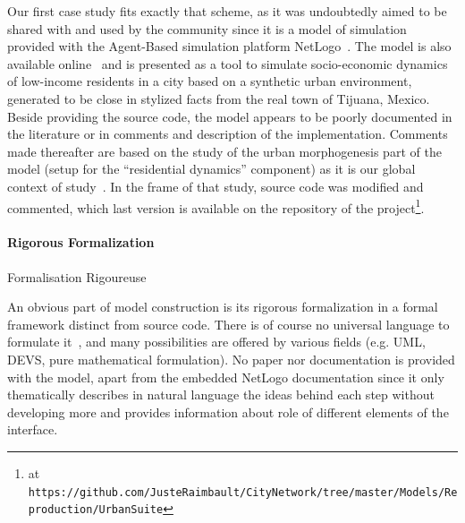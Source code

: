 Our first case study fits exactly that scheme, as it was undoubtedly aimed to be shared with and used by the community since it is a model of simulation provided with the Agent-Based simulation platform NetLogo~\cite{wilensky1999netlogo}. The model is also available online~\cite{de2007netlogo} and is presented as a tool to simulate socio-economic dynamics of low-income residents in a city based on a synthetic urban environment, generated to be close in stylized facts from the real town of Tijuana, Mexico. Beside providing the source code, the model appears to be poorly documented in the literature or in comments and description of the implementation. Comments made thereafter are based on the study of the urban morphogenesis part of the model (setup for the ``residential dynamics'' component) as it is our global context of study~\cite{raimbault2014vers}. In the frame of that study, source code was modified and commented, which last version is available on the repository of the project\footnote{at \texttt{https://github.com/JusteRaimbault/CityNetwork/tree/master/Models/Reproduction/UrbanSuite}}.




\paragraph{Rigorous Formalization}{Formalisation Rigoureuse}

An obvious part of model construction is its rigorous formalization in a formal framework distinct from source code. There is of course no universal language to formulate it~\cite{banos2013pour}, and many possibilities are offered by various fields (e.g. UML, DEVS, pure mathematical formulation). No paper nor documentation is provided with the model, apart from the embedded NetLogo documentation since it only thematically describes in natural language the ideas behind each step without developing more and provides information about role of different elements of the interface.

